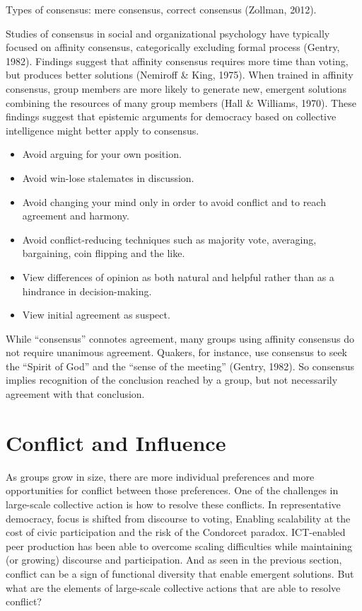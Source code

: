 Types of consensus: mere consensus, correct consensus (Zollman, 2012).

Studies of consensus in social and organizational psychology have typically focused on affinity consensus, categorically excluding formal process (Gentry, 1982). Findings suggest that affinity consensus requires more time than voting, but produces better solutions (Nemiroff \& King, 1975). When trained in affinity consensus, group members are more likely to generate new, emergent solutions combining the resources of many group members (Hall \& Williams, 1970). These findings suggest that epistemic arguments for democracy based on collective intelligence might better apply to consensus.
\begin{itemize}
\item{Avoid arguing for your own position.}
\item{Avoid win-lose stalemates in discussion.}
\item{Avoid changing your mind only in order to avoid conflict and to reach agreement and harmony.}
\item{Avoid conflict-reducing techniques such as majority vote, averaging, bargaining, coin flipping and the like.}
\item{View differences of opinion as both natural and helpful rather than as a hindrance in decision-making.}
\item{View initial agreement as suspect.}
\end{itemize}

While ``consensus'' connotes agreement, many groups using affinity consensus do not require unanimous agreement. Quakers, for instance, use consensus to seek the ``Spirit of God'' and the ``sense of the meeting'' (Gentry, 1982). So consensus implies recognition of the conclusion reached by a group, but not necessarily agreement with that conclusion.

\section{Conflict and Influence}
As groups grow in size, there are more individual preferences and more opportunities for conflict between those preferences. One of the challenges in large-scale collective action is how to resolve these conflicts. In representative democracy, focus is shifted from discourse to voting, 
Enabling scalability at the cost of civic participation and the risk of the Condorcet paradox. ICT-enabled peer production has been able to overcome scaling difficulties while maintaining (or growing) discourse and participation. And as seen in the previous section, conflict can be a sign of functional diversity that enable emergent solutions. But what are the elements of large-scale collective actions that are able to resolve conflict?

